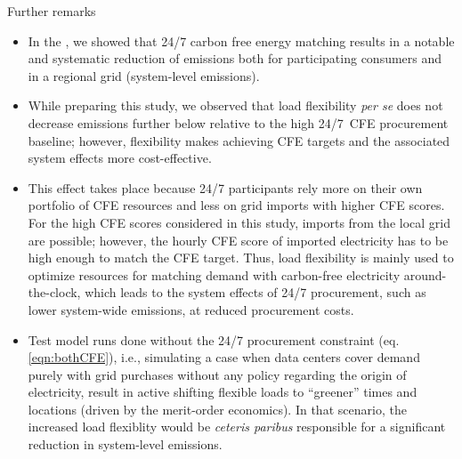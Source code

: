 \begin{frame}{Further remarks}

  {\footnotesize 

  \begin{itemize}

  \item  In the , we showed that 24/7 carbon free energy matching results in a \alert{notable and systematic reduction of emissions} both for participating consumers and in a regional grid (system-level emissions). 
  
  \item While preparing this study, we observed that load flexibility \textit{per se} does not decrease emissions further below relative to the high 24/7~CFE procurement baseline; however, flexibility makes achieving CFE targets and the associated system effects \alert{more cost-effective}.

  \item This effect takes place because 24/7 participants rely more on their own portfolio of CFE resources and less on grid imports with higher CFE scores.
  For the high CFE scores considered in this study, imports from the local grid are possible; however, the hourly CFE score of imported electricity has to be high enough to match the CFE target. 
  Thus, load flexibility is mainly used to optimize resources for matching demand with carbon-free electricity around-the-clock, which leads to the system effects of 24/7 procurement, such as lower system-wide emissions, at reduced procurement costs.

  \item Test model runs done without the 24/7 procurement constraint (eq. \ref{eqn:bothCFE}), i.e., simulating a case when data centers cover demand purely with grid purchases without any policy regarding the origin of electricity, result in active shifting flexible loads to \enquote{greener} times and locations (driven by the merit-order economics). In that scenario, the increased load flexiblity would be \textit{ceteris paribus} responsible for a significant reduction in system-level emissions.

  \end{itemize}
  }
\end{frame}


